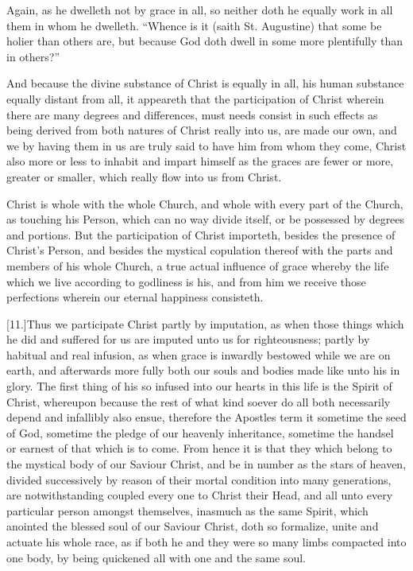 Again, as he dwelleth not by grace in all, so neither doth he equally work in all them in whom he dwelleth. “Whence is it (saith St. Augustine) that some be holier than others are, but because God doth dwell in some more plentifully than in others?”

And because the divine substance of Christ is equally in all, his human substance equally distant from all, it appeareth that the participation of Christ wherein there are many degrees and differences, must needs consist in such effects as being derived from both natures of Christ really into us, are made our own, and we by having them in us are truly said to have him from whom they come, Christ also more or less to inhabit and impart himself as the graces are fewer or more, greater or smaller, which really flow into us from Christ.

Christ is whole with the whole Church, and whole with every part of the Church, as touching his Person, which can no way divide itself, or be possessed by degrees and portions. But the participation of Christ importeth, besides the presence of Christ’s Person, and besides the mystical copulation thereof with the parts and members of his whole Church, a true actual influence of grace whereby the life which we live according to godliness is his, and from him we receive those perfections wherein our eternal happiness consisteth.




[11.]Thus we participate Christ partly by imputation, as when those things which he did and suffered for us are imputed unto us for righteousness; partly by habitual and real infusion, as when grace is inwardly bestowed while we are on earth, and afterwards more fully both our souls and bodies made like unto his in glory. The first thing of his so infused into our hearts in this life is the Spirit of Christ, whereupon because the rest of what kind soever do all both necessarily depend and infallibly also ensue, therefore the Apostles term it sometime the seed of God, sometime the pledge of our heavenly inheritance, sometime the handsel or earnest of that which is to come. From hence it is that they which belong to the mystical body of our Saviour Christ, and be in number as the stars of heaven, divided successively by reason of their mortal condition into many generations, are notwithstanding coupled every one to Christ their Head, and all unto every particular person amongst themselves, inasmuch as the same Spirit, which anointed the blessed soul of our Saviour Christ, doth so formalize, unite and actuate his whole race, as if both he and they were so many limbs compacted into one body, by being quickened all with one and the same soul.

